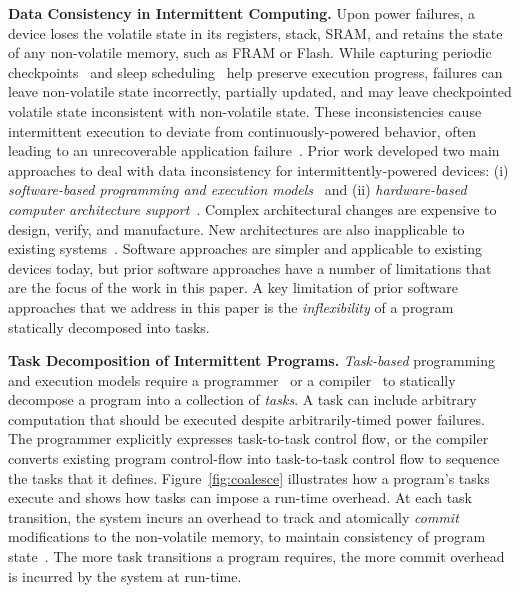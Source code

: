 \textbf{Data Consistency in Intermittent Computing.}  
Upon power failures, a device loses the volatile
state in its registers, stack, SRAM, and retains the state of any non-volatile
memory, such as FRAM or Flash. While capturing periodic
checkpoints~\citep{mementos,quickrecall} and sleep
scheduling~\citep{dewdrop,hibernus,hibernusplusplus} help preserve execution
progress, failures can leave non-volatile state incorrectly, partially updated,
and may leave checkpointed volatile state inconsistent with non-volatile state.
These inconsistencies cause intermittent execution to deviate from
continuously-powered behavior, often leading to an unrecoverable
application failure~\citep{dino,edb}. Prior work developed two main approaches to deal with data inconsistency for
intermittently-powered devices: (i) \emph{software-based programming and
execution models}~\citep{dino,ratchet,chain,alpaca} and (ii)
\emph{hardware-based computer architecture
support}~\citep{hicks_isca_2017,idetic,nvp}. Complex architectural changes are
expensive to design, verify, and manufacture. New architectures are also
inapplicable to existing systems~\citep{hicks_isca_2017,nvp}. Software
approaches are simpler and applicable to existing devices today, but prior
software approaches have a number of limitations that are the focus of the work
in this paper. A key limitation of prior software approaches that we address in this paper is the {\em inflexibility} of a program statically decomposed into tasks. 

\textbf{Task Decomposition of Intermittent Programs.} {\em
Task-based} programming and execution models require a
programmer~\citep{alpaca,chain} or a compiler~\cite{baghsorkhi_cgo_2018} to
statically decompose a program into a collection of {\em tasks}.  A task can
include arbitrary computation that should be executed despite arbitrarily-timed power failures.
%
The programmer explicitly expresses task-to-task control flow, or the compiler
converts existing program control-flow into task-to-task control flow to sequence 
the tasks that it defines.
%
Figure~\ref{fig:coalesce} illustrates how a program's tasks execute and
shows how tasks can impose a run-time overhead. At each task transition, the system incurs an overhead to track and atomically \emph{commit} modifications to the non-volatile memory, to maintain consistency of program state~\citep{chain,alpaca}. The more task transitions a program requires, the more commit overhead is incurred by the system at run-time.

